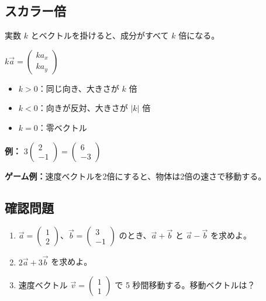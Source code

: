 \documentclass[paper=a4,fleqn]{jlreq}
\newcommand{\formula}[1]{%
  \vspace{4pt}%
  \begin{center}{\large\bfseries\boldmath\(\displaystyle #1\)}\end{center}%
  \vspace{4pt}%
}
\begin{document}
\subsection{スカラー倍}

実数 \(k\) とベクトルを掛けると、成分がすべて \(k\) 倍になる。

\formula{k\vec{a} = \begin{pmatrix} ka_x \\ ka_y \end{pmatrix}}

\begin{itemize}
  \item \(k > 0\)：同じ向き、大きさが \(k\) 倍
  \item \(k < 0\)：向きが反対、大きさが \(|k|\) 倍
  \item \(k = 0\)：零ベクトル
\end{itemize}

\textbf{例：} \(3 \begin{pmatrix} 2 \\ -1 \end{pmatrix} = \begin{pmatrix} 6 \\ -3 \end{pmatrix}\)

\textbf{ゲーム例：}速度ベクトルを2倍にすると、物体は2倍の速さで移動する。

\subsection{確認問題}
\begin{enumerate}
  \item \(\vec{a} = \begin{pmatrix} 1 \\ 2 \end{pmatrix}\)、\(\vec{b} = \begin{pmatrix} 3 \\ -1 \end{pmatrix}\) のとき、\(\vec{a} + \vec{b}\) と \(\vec{a} - \vec{b}\) を求めよ。
  \item \(2\vec{a} + 3\vec{b}\) を求めよ。
  \item 速度ベクトル \(\vec{v} = \begin{pmatrix} 1 \\ 1 \end{pmatrix}\) で 5 秒間移動する。移動ベクトルは？
\end{enumerate}

\newpage
\end{document}
